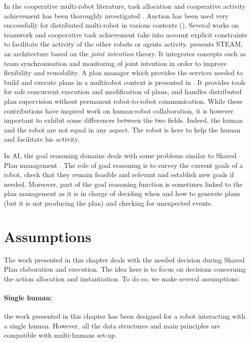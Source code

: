 \documentclass[english,a4paper,11pt,twoside]{StyleThese}
\begin{document}
In the cooperative multi-robot literature, task allocation and cooperative activity achievement has been thoroughly investigated \cite{gerkey2004formal}. Auction has been used very successfully for distributed multi-robot in various contexts (\cite{gerkey2002sold,botelho1999m+}). Several works on teamwork and cooperative task achievement take into account explicit constraints to facilitate the activity of the other robots or agents activity. \cite{tambe1997agent} presents STEAM, an architecture based on the \textit{joint intention} theory. It integrates concepts such as team synchronisation and monitoring of joint intention in order to improve flexibility and reusability. A plan manager which provides the services needed to build and execute plans in a multirobot context is presented in \cite{joyeux2009plan}. It provides tools for safe concurrent execution
and modification of plans, and handles distributed plan supervision
without permanent robot-to-robot communication. While these contributions have inspired work on human-robot collaboration, it is however important to exhibit some differences between the two fields. Indeed, the human and the robot are not equal in any aspect. The robot is here to help the human and facilitate his activity.

In AI, the goal reasoning domains deals with some problems similar to Shared Plan management \cite{molineaux2010goal, roberts2016goal}. The role of goal reasoning is to survey the current goals of a robot, check that they remain feasible and relevant and establish new goals if needed. Moreover, part of the goal reasoning function is sometimes linked to the plan management as it is in charge of deciding when and how to generate plans (but it is not producing the plan) and checking for unexpected events. 

\section{Assumptions}

The work presented in this chapter deals with the needed decision during Shared Plan elaboration and execution. The idea here is to focus on decisions concerning the action allocation and instantiation. To do so, we make several assumptions:

\paragraph{Single human:} the work presented in this chapter has been designed for a robot interacting with a single human. However, all the data structures and main principles are compatible with multi-humans set-up.
\end{document}
